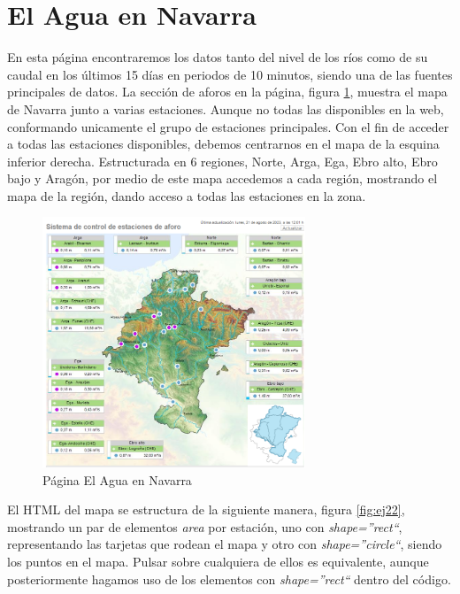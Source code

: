 \section{El Agua en Navarra}
En esta página encontraremos los datos tanto del nivel de los ríos como de su caudal en los últimos 15 días en periodos de 10 minutos, siendo una de las fuentes principales de datos.
\newline
\newline
La sección de aforos en la página, figura \ref{fig:ej4}, muestra el mapa de Navarra junto a varias estaciones. Aunque no todas las disponibles en la web, conformando unicamente el grupo de estaciones principales.\newline
\newline
Con el fin de acceder a todas las estaciones disponibles, debemos centrarnos en el mapa de la esquina inferior derecha. Estructurada en 6 regiones, Norte, Arga, Ega, Ebro alto, Ebro bajo y Aragón, por medio de este mapa accedemos a cada región, mostrando el mapa de la región, dando acceso a todas las estaciones en la zona.

\begin{figure} [H]
	\centering
	\includegraphics[width=0.7\textwidth]{fig/AguaEnNavarraCode.png}
	\caption[Página principal de aforos de El Agua en Navarra]{Página El Agua en Navarra}
	\label{fig:ej4}
\end{figure}

El HTML del mapa se estructura de la siguiente manera, figura \ref{fig:ej22}, mostrando un par de elementos \textit{area} por estación, uno con \textit{shape=''rect``}, representando las tarjetas que rodean el mapa y otro con \textit{shape=''circle``}, siendo los puntos en el mapa. Pulsar sobre cualquiera de ellos es equivalente, aunque posteriormente hagamos uso de los elementos con \textit{shape=''rect``} dentro del código.

